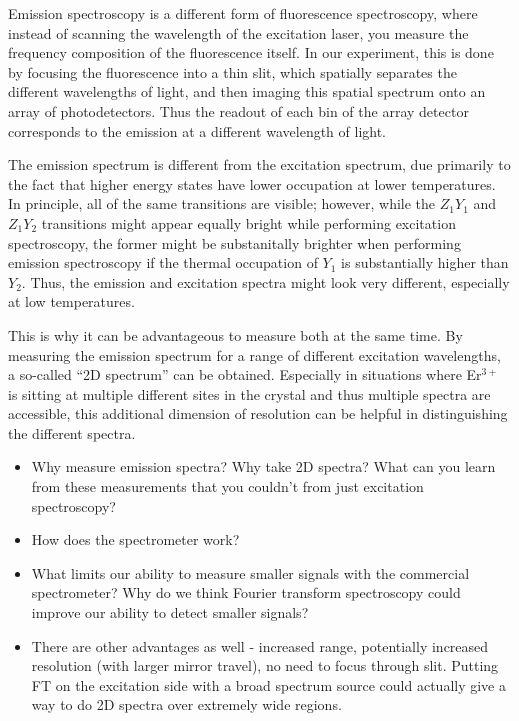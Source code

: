 \documentclass[12pt]{puthesis}
\newcommand{\erbium}[1][ ]{Er$^{3+}$#1}
\begin{document}
Emission spectroscopy is a different form of fluorescence spectroscopy, where instead of scanning the wavelength of the excitation laser, you measure the frequency composition of the fluorescence itself. In our experiment, this is done by focusing the fluorescence into a thin slit, which spatially separates the different wavelengths of light, and then imaging this spatial spectrum onto an array of photodetectors. Thus the readout of each bin of the array detector corresponds to the emission at a different wavelength of light.

The emission spectrum is different from the excitation spectrum, due primarily to the fact that higher energy states have lower occupation at lower temperatures. In principle, all of the same transitions are visible; however, while the $Z_{1}Y_{1}$ and $Z_{1}Y_{2}$ transitions might appear equally bright while performing excitation spectroscopy, the former might be substanitally brighter when performing emission spectroscopy if the thermal occupation of $Y_{1}$ is substantially higher than $Y_{2}$. Thus, the emission and excitation spectra might look very different, especially at low temperatures.

This is why it can be advantageous to measure both at the same time. By measuring the emission spectrum for a range of different excitation wavelengths, a so-called ``2D spectrum'' can be obtained. Especially in situations where \erbium is sitting at multiple different sites in the crystal and thus multiple spectra are accessible, this additional dimension of resolution can be helpful in distinguishing the different spectra.



\begin{itemize}
\item Why measure emission spectra? Why take 2D spectra? What can you learn from these measurements that you couldn't from just excitation spectroscopy?

\item How does the spectrometer work? 

\item What limits our ability to measure smaller signals with the commercial spectrometer? Why do we think Fourier transform spectroscopy could improve our ability to detect smaller signals?

\item There are other advantages as well - increased range, potentially increased resolution (with larger mirror travel), no need to focus through slit. Putting FT on the excitation side with a broad spectrum source could actually give a way to do 2D spectra over extremely wide regions.
\end{itemize}
\end{document}
